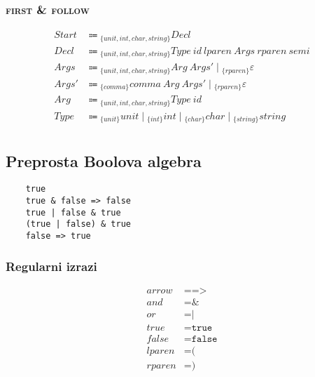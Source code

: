 \documentclass{report}
\newcommand{\Null}{\varepsilon}
\newcommand{\Char}[1]{\texttt{#1}}
\newcommand{\Spc}{\ }
\newcommand{\Union}{\mathrel{|}}
\newcommand{\FIRST}{\textsc{first}}
\newcommand{\FOLLOW}{\textsc{follow}}
\newcommand{\Arrow}{\Coloneq}
\newlength{\arrow}
\newcommand{\NT}[1]{{#1}}
\newcommand{\T}[1]{{#1}}
\newcommand{\Lookahead}[1]{{}_{\{{#1}\}}}
\begin{document}
    \subsubsection*{{\FIRST} \& {\FOLLOW}}
    \begin{equation*}
      \begin{aligned}
        \NT{Start} &\Arrow \Lookahead{\T{unit}, \T{int}, \T{char}, \T{string}} \NT{Decl}\\
        \NT{Decl} &\Arrow \Lookahead{\T{unit}, \T{int}, \T{char}, \T{string}} \NT{Type} \Spc \T{id} \Spc \T{lparen} \Spc \NT{Args} \Spc \T{rparen} \Spc \T{semi}\\
        \NT{Args} &\Arrow \Lookahead{\T{unit}, \T{int}, \T{char}, \T{string}} \NT{Arg} \Spc \NT{Args'} \Union \Lookahead{\T{rparen}} \Null\\
        \NT{Args'} &\Arrow \Lookahead{\T{comma}} \T{comma} \Spc \NT{Arg} \Spc \NT{Args'} \Union \Lookahead{\T{rparen}} \Null \\
        \NT{Arg} &\Arrow \Lookahead{\T{unit}, \T{int}, \T{char}, \T{string}} \NT{Type} \Spc \T{id}\\
        \NT{Type} &\Arrow \Lookahead{\T{unit}} \T{unit} \Union \Lookahead{\T{int}} \T{int} \Union \Lookahead{\T{char}} \T{char} \Union \Lookahead{\T{string}} \T{string}\\
      \end{aligned}
    \end{equation*}

    \subsection{Preprosta Boolova algebra}
    \begin{verbatim}
    true
    true & false => false
    true | false & true
    (true | false) & true
    false => true
    \end{verbatim}

    \subsubsection*{Regularni izrazi}
    \begin{equation*}
      \begin{aligned}
        \T{arrow} &= \Char{=>}\\
        \T{and} &= \Char{\&}\\
        \T{or} &= \Char{|}\\
        \T{true} &= \Char{true}\\
        \T{false} &= \Char{false}\\
        \T{lparen} &= \Char{(}\\
        \T{rparen} &= \Char{)}\\
      \end{aligned}
    \end{equation*}
\end{document}
